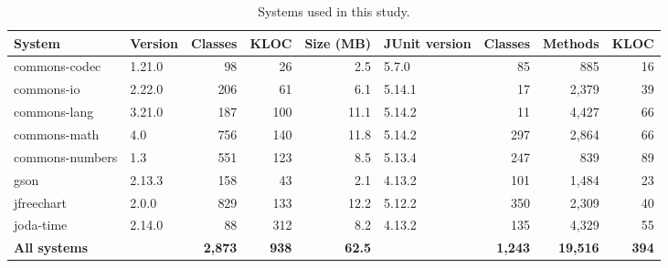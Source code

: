 

\begin{xltabular}{\linewidth}{l l r r r l r r r}
    \caption{Systems used in this study.}\label{tab:systems} \\[10pt]
    \toprule
    \textbf{System} & \textbf{Version} & \textbf{Classes} & \textbf{KLOC} & \textbf{Size (MB)} & \textbf{JUnit version} & \textbf{Classes} & \textbf{Methods} & \textbf{KLOC} \\
    \midrule
    commons-codec & 1.21.0 & 98 & 26 & 2.5 & 5.7.0 & 85 & 885 & 16 \\
    commons-io & 2.22.0 & 206 & 61 & 6.1 & 5.14.1 & 17 & 2,379 & 39 \\
    commons-lang & 3.21.0 & 187 & 100 & 11.1 & 5.14.2 & 11 & 4,427 & 66 \\
    commons-math & 4.0 & 756 & 140 & 11.8 & 5.14.2 & 297 & 2,864 & 66 \\
    commons-numbers & 1.3 & 551 & 123 & 8.5 & 5.13.4 & 247 & 839 & 89 \\
    gson & 2.13.3 & 158 & 43 & 2.1 & 4.13.2 & 101 & 1,484 & 23 \\
    jfreechart & 2.0.0 & 829 & 133 & 12.2 & 5.12.2 & 350 & 2,309 & 40 \\
    joda-time & 2.14.0 & 88 & 312 & 8.2 & 4.13.2 & 135 & 4,329 & 55 \\
    \midrule
    \textbf{All systems} & & \textbf{2,873} & \textbf{938} & \textbf{62.5} & & \textbf{1,243} & \textbf{19,516} & \textbf{394} \\
    \bottomrule
  \end{xltabular}



